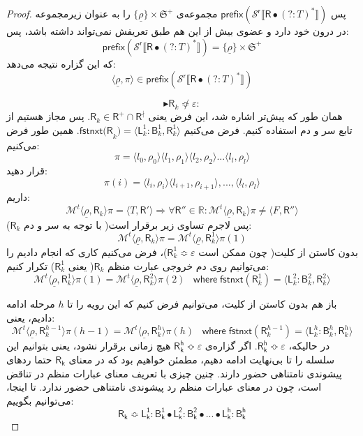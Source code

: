 \begin{proof}
پس 
$\mathsf{prefix(\mathcal{S}^r \llbracket \mathsf{R} \bullet (?:\mathit{T})^* \rrbracket)}$
مجموعه‌ی 
$\{\underline{\rho}\} \times \mathfrak{S}^+$
را به عنوان زیرمجموعه در درون خود دارد و عضوی بیش از این هم طبق تعریفش نمی‌تواند داشته باشد، پس:
$$\mathsf{prefix(\mathcal{S}^r \llbracket \mathsf{R} \bullet (?:\mathit{T})^* \rrbracket)}=
\{\underline{\rho}\} \times \mathfrak{S}^+$$
که این گزاره نتیجه می‌دهد:
$$\langle \underline{\rho}, \pi \rangle \in \mathsf{prefix(\mathcal{S}^r \llbracket \mathsf{R} \bullet (?:\mathit{T})^* \rrbracket)}$$

$$\blacktriangleright \mathsf{R}_k \not\Bumpeq \varepsilon:$$
همان طور که پیش‌تر اشاره شد، این فرض یعنی
$\mathsf{R}_k \in \mathsf{R}^+ \cap \mathsf{R}^\nmid$.
پس مجاز هستیم از تابع سر و دم استفاده کنیم. فرض می‌کنیم 
$\mathsf{fstnxt(R}_k) = \langle \mathsf{L}_k^1 : \mathsf{B}_k^1 , \mathsf{R}_k^1 \rangle$.
همین طور فرض می‌کنیم:
$$\pi = \langle l_0,\rho_0 \rangle \langle l_1 , \rho_1 \rangle \langle l_2 , \rho_2 \rangle ... \langle l_l , \rho_l \rangle$$
قرار دهید:
$$\pi(i)=\langle l_i , \rho_i\rangle \langle l_{i+1},\rho_{i+1}\rangle,...,\langle l_l,\rho_l \rangle$$
داریم:
$$\mathcal{M}^t \langle \underline{\rho},\mathsf{R}_k \rangle \pi = \langle \mathit{T} , \mathsf{R'} \rangle \Rightarrow \forall \mathsf{R''} \in \mathbb{R}: \mathcal{M}^t \langle \underline{\rho},\mathsf{R}_k \rangle \pi \neq \langle \mathit{F},\mathsf{R}'' \rangle$$
پس لاجرم تساوی زیر برقرار است( با توجه به سر و دم $\mathsf{R}_k$):
$$\mathcal{M}^t \langle \underline{\rho}, \mathsf{R}_k \rangle \pi= \mathcal{M}^t \langle \underline{\rho}, \mathsf{R}_k^1 \rangle \pi(1)$$
بدون کاستن از کلیت( چون ممکن است $\mathsf{R}_k^1 \Bumpeq \varepsilon$)، فرض می‌کنیم کاری که انجام دادیم را می‌توانیم روی دم خروجی عبارت منظم $\mathsf{R}_k$( یعنی $\mathsf{R}_k^1$) تکرار کنیم:
$$\mathcal{M}^t \langle \underline{\rho}, \mathsf{R}_k^1 \rangle \pi(1)= \mathcal{M}^t \langle \underline{\rho}, \mathsf{R}_k^2 \rangle \pi(2)\;\;\; \mathsf{where\;fstnxt}(\mathsf{R}_k^1)=\langle \mathsf{L}_k^2 : \mathsf{B}_k^2 , \mathsf{R}_k^2 \rangle$$

باز هم بدون کاستن از کلیت، می‌توانیم فرض کنیم که این رویه را تا $h$ مرحله ادامه دادیم، یعنی:
$$\mathcal{M}^t \langle \underline{\rho},\mathsf{R}_k^{h-1} \rangle \pi(h-1)=\mathcal{M}^t\langle \underline{\rho},\mathsf{R}_k^{h} \rangle \pi(h) \;\;\;
\mathsf{where\;fstnxt}(\mathsf{R}_k^{h-1})=\langle \mathsf{L}_k^{h} : \mathsf{B}_k^{h} , \mathsf{R}_k^{h} \rangle$$
در حالیکه، 
$\mathsf{R_k^h} \Bumpeq \varepsilon$. 
اگر گزاره‌ی $\mathsf{R_k^h} \Bumpeq \varepsilon$ هیچ زمانی برقرار نشود، یعنی بتوانیم این سلسله را تا بی‌نهایت ادامه دهیم، مطمئن خواهیم بود که در معنای $\mathsf{R_k}$ حتما ردهای پیشوندی نامتناهی حضور دارند. چنین چیزی با تعریف معنای عبارات منظم در تناقض است، چون در معنای عبارات منظم رد پیشوندی نامتناهی حضور ندارد.
تا اینجا، می‌توانیم بگوییم:
$$\mathsf{R_k} \Bumpeq \mathsf{L_k^1 : B_k^1 \bullet L_k^2:B_k^2 \bullet ... \bullet L_k^h:B_k^h}$$


\end{proof}
